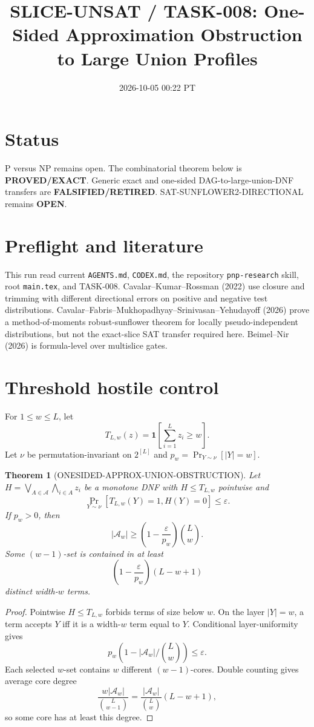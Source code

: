 \documentclass[11pt]{article}
\title{SLICE-UNSAT / TASK-008: One-Sided Approximation Obstruction to Large Union Profiles}
\date{2026-10-05 00:22 PT}
\newtheorem{theorem}{Theorem}
\begin{document}
\maketitle
\section*{Status}
P versus NP remains open. The combinatorial theorem below is \textbf{PROVED/EXACT}. Generic exact and one-sided DAG-to-large-union-DNF transfers are \textbf{FALSIFIED/RETIRED}. SAT-SUNFLOWER2-DIRECTIONAL remains \textbf{OPEN}.

\section*{Preflight and literature}
This run read current \texttt{AGENTS.md}, \texttt{CODEX.md}, the repository \texttt{pnp-research} skill, root \texttt{main.tex}, and TASK-008. Cavalar--Kumar--Rossman (2022) use closure and trimming with different directional errors on positive and negative test distributions. Cavalar--Fabris--Mukhopadhyay--Srinivasan--Yehudayoff (2026) prove a method-of-moments robust-sunflower theorem for locally pseudo-independent distributions, but not the exact-slice SAT transfer required here. Beimel--Nir (2026) is formula-level over multislice gates.

\section*{Threshold hostile control}
For \(1\le w\le L\), let
\[
T_{L,w}(z)=\mathbf 1[\sum_{i=1}^{L}z_i\ge w].
\]
Let \(\nu\) be permutation-invariant on \(2^{[L]}\) and \(p_w=\Pr_{Y\sim\nu}[|Y|=w]\).

\begin{theorem}[ONESIDED-APPROX-UNION-OBSTRUCTION]
Let \(H=\bigvee_{A\in\mathcal A}\bigwedge_{i\in A}z_i\) be a monotone DNF with \(H\le T_{L,w}\) pointwise and
\[
\Pr_{Y\sim\nu}[T_{L,w}(Y)=1,H(Y)=0]\le\varepsilon.
\]
If \(p_w>0\), then
\[
|\mathcal A_w|\ge\left(1-\frac{\varepsilon}{p_w}\right)\binom Lw.
\]
Some \((w-1)\)-set is contained in at least
\[
\left(1-\frac{\varepsilon}{p_w}\right)(L-w+1)
\]
distinct width-\(w\) terms.
\end{theorem}

\begin{proof}
Pointwise \(H\le T_{L,w}\) forbids terms of size below \(w\). On the layer \(|Y|=w\), a term accepts \(Y\) iff it is a width-\(w\) term equal to \(Y\). Conditional layer-uniformity gives
\[
p_w(1-|\mathcal A_w|/\binom Lw)\le\varepsilon.
\]
Each selected \(w\)-set contains \(w\) different \((w-1)\)-cores. Double counting gives average core degree
\[
\frac{w|\mathcal A_w|}{\binom L{w-1}}
=
\frac{|\mathcal A_w|}{\binom Lw}(L-w+1),
\]
so some core has at least this degree.
\end{proof}
\end{document}

